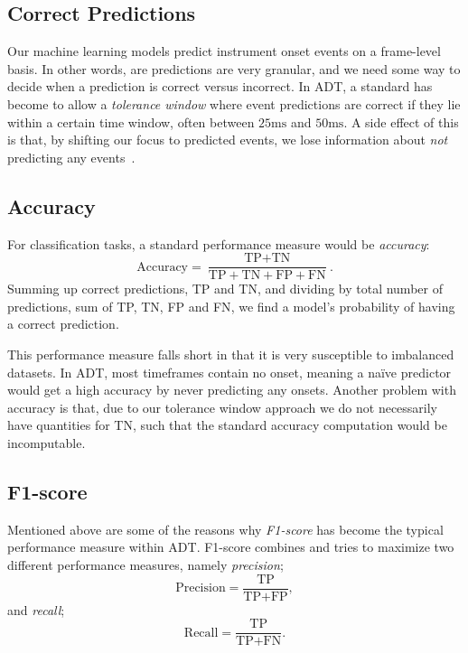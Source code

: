 \subsection{Correct Predictions}

Our machine learning models predict instrument onset events on a frame-level basis. In other words, are predictions are very granular, and we need some way to decide when a prediction is correct versus incorrect. In \gls{ADT}, a standard has become to allow a \textit{tolerance window} where event predictions are correct if they lie within a certain time window, often between $25\text{ms}$ and $50\text{ms}$. A side effect of this is that, by shifting our focus to predicted events, we lose information about \textit{not} predicting any events~\cite{vogl2016recurrent}.

\subsection{Accuracy}

For classification tasks, a standard performance measure would be \textit{accuracy}: \[ \text{Accuracy} = \frac{\text{TP} + \text{TN}}{\text{TP} + \text{TN} + \text{FP} + \text{FN}}.\] Summing up correct predictions, \gls{TP} and \gls{TN}, and dividing by total number of predictions, sum of \gls{TP}, \gls{TN}, \gls{FP} and \gls{FN}, we find a model's probability of having a correct prediction.

This performance measure falls short in that it is very susceptible to imbalanced datasets. In \gls{ADT}, most timeframes contain no onset, meaning a naïve predictor would get a high accuracy by never predicting any onsets. Another problem with accuracy is that, due to our tolerance window approach we do not necessarily have quantities for \gls{TN}, such that the standard accuracy computation would be incomputable.

\subsection{F1-score}

Mentioned above are some of the reasons why \textit{F1-score} has become the typical performance measure within \gls{ADT}. F1-score combines and tries to maximize two different performance measures, namely \textit{precision}; \[ \text{Precision} = \frac{\text{TP}}{\text{TP} + \text{FP}}, \] and \textit{recall}; \[ \text{Recall} = \frac{\text{TP}}{\text{TP} + \text{FN}}. \]

